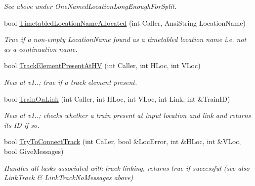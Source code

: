\begin{DoxyCompactItemize}
\begin{DoxyCompactList}\small\item\em See above under \textquotesingle{}One\+Named\+Location\+Long\+Enough\+For\+Split\textquotesingle{}. \end{DoxyCompactList}\item 
\mbox{\label{class_t_track_addd8e149e66c99a295541c9eda13eae4}} 
bool \mbox{\hyperlink{class_t_track_addd8e149e66c99a295541c9eda13eae4}{Timetabled\+Location\+Name\+Allocated}} (int Caller, Ansi\+String Location\+Name)
\begin{DoxyCompactList}\small\item\em True if a non-\/empty Location\+Name found as a timetabled location name i.\+e. not as a continuation name. \end{DoxyCompactList}\item 
\mbox{\label{class_t_track_a1c808ac52b6e5e7081273916ce458638}} 
bool \mbox{\hyperlink{class_t_track_a1c808ac52b6e5e7081273916ce458638}{Track\+Element\+Present\+At\+HV}} (int Caller, int H\+Loc, int V\+Loc)
\begin{DoxyCompactList}\small\item\em New at v1..; true if a track element present. \end{DoxyCompactList}\item 
\mbox{\label{class_t_track_a12d4069a6a201e13a83347c555a465b2}} 
bool \mbox{\hyperlink{class_t_track_a12d4069a6a201e13a83347c555a465b2}{Train\+On\+Link}} (int Caller, int H\+Loc, int V\+Loc, int Link, int \&Train\+ID)
\begin{DoxyCompactList}\small\item\em New at v1..; checks whether a train present at input location and link and returns its ID if so. \end{DoxyCompactList}\item 
\mbox{\label{class_t_track_ac1dc75f1df6278c62f13e23469b80982}} 
bool \mbox{\hyperlink{class_t_track_ac1dc75f1df6278c62f13e23469b80982}{Try\+To\+Connect\+Track}} (int Caller, bool \&Loc\+Error, int \&H\+Loc, int \&V\+Loc, bool Give\+Messages)
\begin{DoxyCompactList}\small\item\em Handles all tasks associated with track linking, returns true if successful (see also Link\+Track \& Link\+Track\+No\+Messages above) \end{DoxyCompactList}\item 

\end{DoxyCompactItemize}
